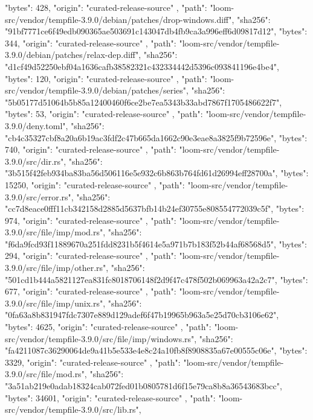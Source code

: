 {{      "bytes": 428,
      "origin": "curated-release-source"
    },
    {
      "path": "loom-src/vendor/tempfile-3.9.0/debian/patches/drop-windows.diff",
      "sha256": "91bf7771ce6f49edb090365ae503691c143047db4fb9ca3a996eff6d09817d12",
      "bytes": 344,
      "origin": "curated-release-source"
    },
    {
      "path": "loom-src/vendor/tempfile-3.9.0/debian/patches/relax-dep.diff",
      "sha256": "d1cf49d52250ebf04a1636cafb38582321c432334442d5396c093841196e4be4",
      "bytes": 120,
      "origin": "curated-release-source"
    },
    {
      "path": "loom-src/vendor/tempfile-3.9.0/debian/patches/series",
      "sha256": "5b05177d51064b5b85a12400460f6ce2be7ea5343b33abd7867f1705486622f7",
      "bytes": 53,
      "origin": "curated-release-source"
    },
    {
      "path": "loom-src/vendor/tempfile-3.9.0/deny.toml",
      "sha256": "cb4c35327cbf8a20a6b19ac3fdf2c47b665da1662c90e3eae8a3825f9b72596e",
      "bytes": 740,
      "origin": "curated-release-source"
    },
    {
      "path": "loom-src/vendor/tempfile-3.9.0/src/dir.rs",
      "sha256": "3b515f42feb934ba83ba56d506116e5e932c6b863b764fd61d26994eff28700a",
      "bytes": 15250,
      "origin": "curated-release-source"
    },
    {
      "path": "loom-src/vendor/tempfile-3.9.0/src/error.rs",
      "sha256": "cc7d8eace0fff11cb342158d2885d5637bfb14b24ef30755e808554772039c5f",
      "bytes": 974,
      "origin": "curated-release-source"
    },
    {
      "path": "loom-src/vendor/tempfile-3.9.0/src/file/imp/mod.rs",
      "sha256": "f6da9fcd93f11889670a251fdd8231b5f4614e5a971b7b183f52b44af68568d5",
      "bytes": 294,
      "origin": "curated-release-source"
    },
    {
      "path": "loom-src/vendor/tempfile-3.9.0/src/file/imp/other.rs",
      "sha256": "501cd1b444a5821127ea831fc8018706148f2d9f47c478f502b069963a42a2c7",
      "bytes": 677,
      "origin": "curated-release-source"
    },
    {
      "path": "loom-src/vendor/tempfile-3.9.0/src/file/imp/unix.rs",
      "sha256": "0fa63a8b831947fdc7307e889d129adef6f47b19965b963a5e25d70cb3106e62",
      "bytes": 4625,
      "origin": "curated-release-source"
    },
    {
      "path": "loom-src/vendor/tempfile-3.9.0/src/file/imp/windows.rs",
      "sha256": "fa4211087c36290064de9a41b5e533e4e8c24a10fb8f8908835a67e00555c06e",
      "bytes": 3329,
      "origin": "curated-release-source"
    },
    {
      "path": "loom-src/vendor/tempfile-3.9.0/src/file/mod.rs",
      "sha256": "3a51ab219e0adab18324cab072fed01b0805781d6f15e79ca8b8a36543683bcc",
      "bytes": 34601,
      "origin": "curated-release-source"
    },
    {
      "path": "loom-src/vendor/tempfile-3.9.0/src/lib.rs",
}}
